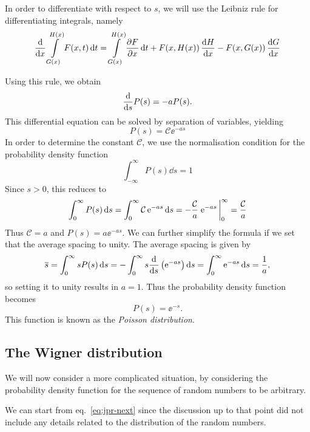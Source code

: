 \documentclass[../thesis.tex]{subfiles}
\theoremstyle{definition}
\begin{document}
In order to differentiate with respect to $s$, we will use the Leibniz rule
for differentiating integrals, namely
\begin{equation}
  \label{eq:leibnitz}
  \dv{x} \int\limits_{G(x)}^{H(x)} F(x, t) \dd{t} = \int\limits_{G(x)}^{H(x)} \pdv{F}{x} \dd{t}
  + F(x, H(x))\, \dv{H}{x} - F(x, G(x))\, \dv{G}{x}
\end{equation}

Using this rule, we obtain
\[
  \dv{s}P(s) = -aP(s).
\]
This differential equation can be solved by separation of variables, yielding
\[
  P(s) = \mathcal{C} \ee^{-as}
\]
In order to determine the constant \(\mathcal{C}\), we use the normalisation condition
for the probability density function
\[
  \int_{-\infty}^{\infty} P(s) \dd{s} = 1
\]
Since \(s>0\), this reduces to
\[
  \int_{0}^{\infty} P(s) \dd{s} = \int_{0}^{\infty} \mathcal{C} \ee^{-as} \dd{s}
  = -\frac{\mathcal{C}}{a} \eval{\ee^{-as}}_0^{\infty} = \frac{\mathcal{C}}{a}
\]
Thus \(\mathcal{C} = a\) and \(P(s) = a \ee^{-as}\).
We can further simplify the formula if we set that the average spacing to unity.
The average spacing is given by
\[
  \overline{s} = \int_{0}^{\infty} s P(s) \dd{s}
  = -\int_{0}^{\infty} s \dv{s} \left( \operatorname{e}^{-as} \right) \dd{s}
  = \int_{0}^{\infty} \operatorname{e}^{-as} \dd{s} = \frac{1}{a},
\]
so setting it to unity results in \(a=1\).
Thus the probability density function becomes
\begin{equation}
  \label{eq:poisson-dist}
  P(s) = \ee^{-s}.
\end{equation}
This function is known as the \emph{Poisson distribution}.

\subsection{The Wigner distribution}

We will now consider a more complicated situation, by considering the
probability density function for the sequence of random numbers to be arbitrary.

We can start from eq.~\eqref{eq:jpr-next} since the discussion up to that point
did not include any details related to the distribution of the random numbers.
\end{document}
